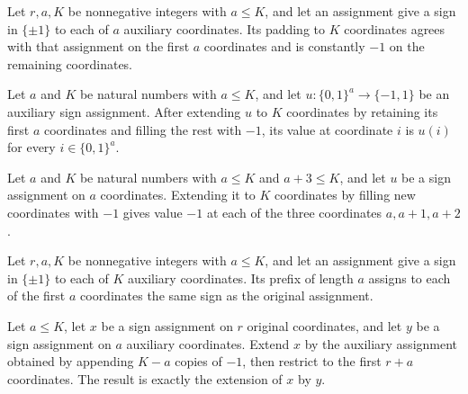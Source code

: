 \begin{definition}
\label{FABL.padAuxiliaryAssignment}
\leanok
{}
Let $r,a,K$ be nonnegative integers with $a\le K$, and let an assignment give a sign in
$\{\pm1\}$ to each of $a$ auxiliary coordinates. Its padding to $K$ coordinates agrees
with that assignment on the first $a$ coordinates and is constantly $-1$ on the
remaining coordinates.
\end{definition}

\begin{theorem}
\label{FABL.padAuxiliaryAssignment_castLE}
\leanok
{}
Let $a$ and $K$ be natural numbers with $a\le K$, and let $u:\{0,1\}^a\to\{-1,1\}$ be an
auxiliary sign assignment. After extending $u$ to $K$ coordinates by retaining its first
$a$ coordinates and filling the rest with $-1$, its value at coordinate $i$ is $u(i)$
for every $i\in\{0,1\}^a$.
\end{theorem}

\begin{theorem}
\label{FABL.padAuxiliaryAssignment_filler}
\leanok
{}
Let $a$ and $K$ be natural numbers with $a\le K$ and $a+3\le K$, and let $u$ be a sign
assignment on $a$ coordinates. Extending it to $K$ coordinates by filling new
coordinates with $-1$ gives value $-1$ at each of the three coordinates $a,a+1,a+2$.
\end{theorem}

\begin{definition}
\label{FABL.prefixAuxiliaryAssignment}
\leanok
{}
Let $r,a,K$ be nonnegative integers with $a\le K$, and let an assignment give a sign in
$\{\pm1\}$ to each of $K$ auxiliary coordinates. Its prefix of length $a$ assigns to
each of the first $a$ coordinates the same sign as the original assignment.
\end{definition}

\begin{theorem}
\label{FABL.restrictLocalAssignment_extend_pad}
\leanok
{}
Let $a\leq K$, let $x$ be a sign assignment on $r$ original coordinates, and let $y$ be
a sign assignment on $a$ auxiliary coordinates. Extend $x$ by the auxiliary assignment
obtained by appending $K-a$ copies of $−1$, then restrict to the first $r+a$
coordinates. The result is exactly the extension of $x$ by $y$.
\end{theorem}


